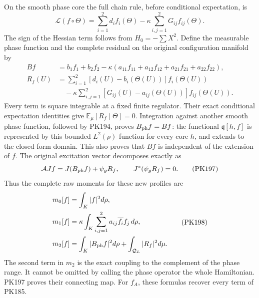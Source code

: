 \documentclass[11pt]{article}
\begin{document}
On the smooth phase core the full chain rule, before conditional
expectation, is
\[
 \mathscr L(f\circ\Theta)
   =\sum_{i=1}^2 d_i f_i(\Theta)
       -\kappa\sum_{i,j=1}^2G_{ij}f_{ij}(\Theta).
 \tag{PK195}
\]
The sign of the Hessian term follows from
\(H_0=-\sum X^2\). Define the measurable phase function and the
complete residual on the original configuration manifold by
\[
 \begin{split}
 Bf&=b_1f_1+b_2f_2
     -\kappa(a_{11}f_{11}+a_{12}f_{12}
                     +a_{21}f_{21}+a_{22}f_{22}),\\
 R_f(U)&=\sum_{i=1}^2[d_i(U)-b_i(\Theta(U))]f_i(\Theta(U))\\
 &\quad-\kappa\sum_{i,j=1}^2
       [G_{ij}(U)-a_{ij}(\Theta(U))]f_{ij}(\Theta(U)).
 \end{split}\tag{PK196}
\]
Every term is square integrable at a fixed finite regulator.
Their exact conditional expectation identities give
\(\mathbb E_\mu[R_f\mid\Theta]=0\).
Integration against another smooth phase function, followed by
PK194, proves \(B_{\rm ph}f=Bf\): the functional
\(\mathfrak q[h,f]\) is represented by this bounded \(L^2(\rho)\)
function for every core \(h\), and extends to the closed form domain.
This also proves that \(Bf\) is independent of the extension of \(f\).
The original excitation vector decomposes exactly as
\[
 \mathcal A Jf=J(B_{\rm ph}f)+\psi_gR_f,\qquad
 J^*(\psi_gR_f)=0 .
 \tag{PK197}
\]
Thus the complete raw moments for these new profiles are
\[
 \begin{split}
 m_0[f]&=\int_K|f|^2d\rho,\\
 m_1[f]&=\kappa\int_K\sum_{i,j=1}^2
                     a_{ij}\overline{f_i}f_j\,d\rho,\\
 m_2[f]&=\int_K|B_{\rm ph}f|^2d\rho
                         +\int_{\mathcal Q_L}|R_f|^2d\mu .
 \end{split}\tag{PK198}
\]
The second term in \(m_2\) is the exact coupling to the complement
of the phase range. It cannot be omitted by calling the phase
operator the whole Hamiltonian. PK197 proves their connecting map.
For \(f_A\), these formulas recover every term of PK185.
\end{document}
